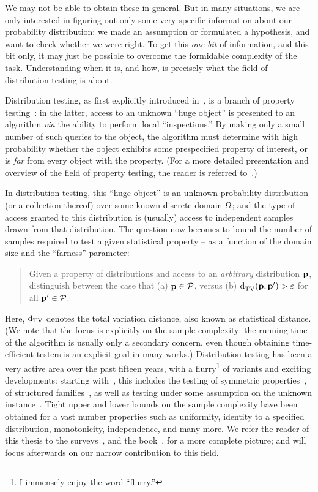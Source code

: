 We may not be able to obtain these in general. But in many situations, we are only interested in figuring out only some very specific information about our probability distribution: we made an assumption or formulated a hypothesis, and want to check whether we were right. To get this \emph{one bit} of information, and this bit only, it may just be possible to overcome the formidable complexity of the task. Understanding when it is, and how, is precisely what the field of distribution testing is about.

Distribution testing, as first explicitly introduced in~\cite{BFRSW:00}, is a branch of property testing~\cite{RS:96,GGR:98}: in the latter, access to an unknown ``huge object'' is presented to an algorithm \textit{via} the ability to perform local ``inspections.'' By making only a small number of such queries to the object, the algorithm must determine with high probability whether the object exhibits some prespecified property of interest, or is \emph{far} from every object with the property. (For a more detailed presentation and overview of the field of property testing, the reader is referred to~\cite{Fischer:01,Ron:08,Ron:10,Goldreich:10,Gol:17,BY:17}.)

In distribution testing, this ``huge object'' is an unknown probability distribution (or a collection thereof) over some known discrete domain ${\Omega}$; and the type of access granted to this distribution is (usually) access to independent samples drawn from that distribution. The question now becomes to bound the number of samples required to test a given statistical property -- as a function of the domain size and the ``farness'' parameter:
\begin{quote}
Given a property of distributions \property and access to an \emph{arbitrary} distribution $\mathbf{p}$, distinguish between the case that \textsf{(a)} $\mathbf{p}\in\mathcal{P}$, versus \textsf{(b)} ${\operatorname{d}_{\rm{TV}}^{}\!\left({\mathbf{p}, \mathbf{p}^\prime}\right)} >\varepsilon$ for all $\mathbf{p}^\prime\in\mathcal{P}$.
\end{quote}
Here, $\operatorname{d}_{\rm{TV}}$ denotes the total variation distance, also known as statistical distance. (We note that the focus is explicitly on the sample complexity: the running time of the algorithm is usually only a secondary concern, even though obtaining time-efficient testers is an explicit goal in many works.) Distribution testing has been a very active area over the past fifteen years, with a flurry\footnote{I immensely enjoy the word ``flurry.''}{} of variants and exciting developments: starting with~\cite{GRexp:00,BFRSW:10,BFFKRW:01}, this includes the testing of symmetric properties~\cite{RRSS:09,Valiant:11,VV:11:stoc,ValiantValiant:11}, of structured families~\cite{BKR:04,ILR:12,AD:15,Canonne:15,ADK:15,CDGR:16,Canonne:16}, as well as testing under some assumption on the unknown instance~\cite{RS:09,DDSVV:13,DKN:15,DKN:15:FOCS}. Tight upper and lower bounds on the sample complexity have been obtained for a vast number properties such as uniformity, identity to a specified distribution, monotonicity, independence, and many more. We refer the reader of this thesis to the surveys~\cite{Rubinfeld:12:Survey,Canonne:15:Survey}, and the book~\cite{Gol:17}, for a more complete picture; and will focus afterwards on our narrow contribution to this field.

